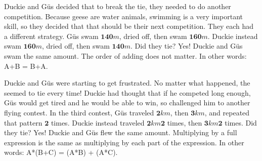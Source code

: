 {Duckie and Güs decided that to break the tie, they needed to do another competition. \linebreak Because geese are water animals, swimming is a very important skill, so they decided that that should be their next competition. They each had a different strategy. Güs swam $\textbf{140} m$, dried off, then swam $\textbf{160} m$. Duckie instead swam $\textbf{160} m$, dried off, then swam $\textbf{140} m$. Did they tie?}
{Yes! Duckie and Güs swam the same amount.}
{The order of adding does not matter. In other words: A+B = B+A.}
{}
{Duckie and Güs were starting to get frustrated. No matter what happened, the seemed to tie every time! Duckie had thought that if he competed long enough, Güs would get tired and he would be able to win, so challenged him to another flying contest. In the third contest, Güs traveled $\textbf{2} km$, then $\textbf{3} km$, and repeated that pattern $\textbf{2}$ times. Duckie instead traveled $\textbf{2} km  \textbf{2}$ times, then $\textbf{3} km  \textbf{2}$ times. Did they tie?}
{Yes! Duckie and Güs flew the same amount.}
{Multiplying by a full expression is the same as multiplying by each part of the expression. In other words: A*(B+C) = (A*B) + (A*C).}
